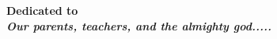 \chapter*{ }
\label{dedication}
\thispagestyle{empty}
\begin{center}
\Huge\bf  Dedicated to\\
\Huge \em Our parents, teachers, and the almighty god.....\\[20ex]
\end{center}
